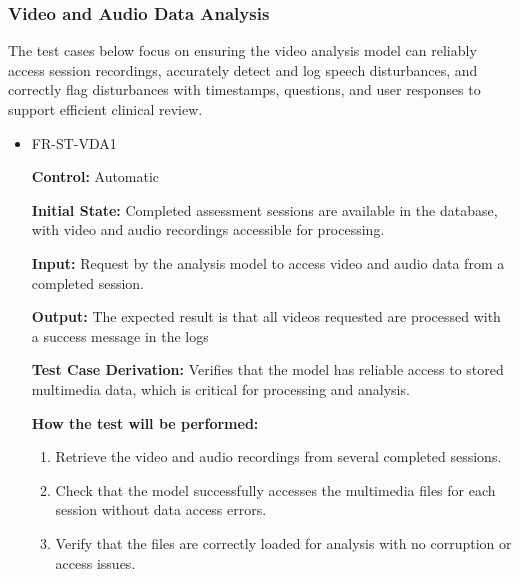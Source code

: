 \documentclass[12pt, titlepage]{article}
\begin{document}
\subsubsection{Video and Audio Data Analysis}

\hspace{2em}The test cases below focus on ensuring the video analysis model can reliably access 
session recordings, accurately detect and log speech disturbances, and correctly flag 
disturbances with timestamps, questions, and user responses to support efficient clinical review.
\begin{itemize}
  \item FR-ST-VDA1
  \begin{mdframed}[linewidth=0.5mm]
      \textbf{Control:} Automatic \par
      \textbf{Initial State:} Completed assessment sessions are available in the database, with video and audio recordings accessible for processing. \par
      \textbf{Input:} Request by the analysis model to access video and audio data from a completed session. \par
      \textbf{Output:} The expected result is that all videos requested are processed with a success message in the logs \par
      \textbf{Test Case Derivation:} Verifies that the model has reliable access to stored multimedia data, which is critical for processing and analysis. \par
      \textbf{How the test will be performed:}
      \begin{enumerate}[noitemsep]
        \item Retrieve the video and audio recordings from several completed sessions.
        \item Check that the model successfully accesses the multimedia files for each session without data access errors.
        \item Verify that the files are correctly loaded for analysis with no corruption or access issues.
      \end{enumerate}
  \end{mdframed}


\end{itemize}
\end{document}
